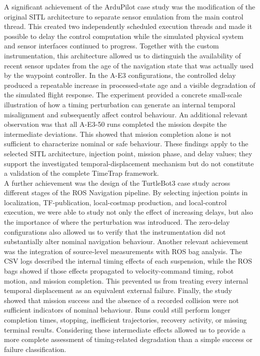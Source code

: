 \noindent A significant achievement of the ArduPilot case study was the modification of the original SITL architecture to separate sensor emulation from the main control thread. This created two independently scheduled execution threads and made it possible to delay the control computation while the simulated physical system and sensor interfaces continued to progress.
Together with the custom instrumentation, this architecture allowed us to distinguish the availability of recent sensor updates from the age of the navigation state that was actually used by the waypoint controller. In the A-E3 configurations, the controlled delay produced a repeatable increase in processed-state age and a visible degradation of the simulated flight response. The experiment provided a concrete small-scale illustration of how a timing perturbation can generate an internal temporal misalignment and subsequently affect control behaviour.
An additional relevant observation was that all A-E3-50 runs completed the mission despite the intermediate deviations. This showed that mission completion alone is not sufficient to characterize nominal or safe behaviour. These findings apply to the selected SITL architecture, injection point, mission phase, and delay values; they support the investigated temporal-displacement mechanism but do not constitute a validation of the complete TimeTrap framework.
\\
A further achievement was the design of the TurtleBot3 case study across different stages of the ROS Navigation pipeline. By selecting injection points in localization, TF-publication, local-costmap production, and local-control execution, we were able to study not only the effect of increasing delays, but also the importance of where the perturbation was introduced. The zero-delay configurations also allowed us to verify that the instrumentation did not substantially alter nominal navigation behaviour. Another relevant achievement was the integration of source-level measurements with ROS bag analysis. The CSV logs described the internal timing effects of each suspension, while the ROS bags showed if those effects propagated to velocity-command timing, robot motion, and mission completion. This prevented us from treating every internal temporal displacement as an equivalent external failure. 
Finally, the study showed that mission success and the absence of a recorded collision were not sufficient indicators of nominal behaviour. Runs could still perform longer completion times, stopping, inefficient trajectories, recovery activity, or missing terminal results. Considering these intermediate effects allowed us to provide a more complete assessment of timing-related degradation than a simple success or failure classification.

